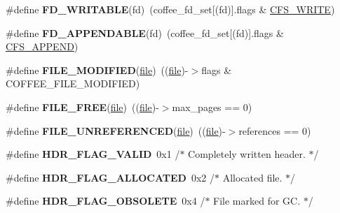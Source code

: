 \begin{DoxyCompactItemize}
\item 
\hypertarget{cfs-coffee_8c_a79709d15b94b762a4b9ea6f5717be08f}{}\#define {\bfseries F\+D\+\_\+\+W\+R\+I\+T\+A\+B\+L\+E}(fd)~(coffee\+\_\+fd\+\_\+set\mbox{[}(fd)\mbox{]}.flags \& \hyperlink{group__cfs_ga798793edf50f38e3e41364f0f6f71201}{C\+F\+S\+\_\+\+W\+R\+I\+T\+E})\label{cfs-coffee_8c_a79709d15b94b762a4b9ea6f5717be08f}

\item 
\hypertarget{cfs-coffee_8c_a70b88c0c34f68524d35d16656a4cf39a}{}\#define {\bfseries F\+D\+\_\+\+A\+P\+P\+E\+N\+D\+A\+B\+L\+E}(fd)~(coffee\+\_\+fd\+\_\+set\mbox{[}(fd)\mbox{]}.flags \& \hyperlink{group__cfs_ga2b402228c26a3590f1d4bf44df0b2b82}{C\+F\+S\+\_\+\+A\+P\+P\+E\+N\+D})\label{cfs-coffee_8c_a70b88c0c34f68524d35d16656a4cf39a}

\item 
\hypertarget{cfs-coffee_8c_aa66cf9bb1e6c681411cde5e1268ae034}{}\#define {\bfseries F\+I\+L\+E\+\_\+\+M\+O\+D\+I\+F\+I\+E\+D}(\hyperlink{structfile}{file})~((\hyperlink{structfile}{file})-\/$>$flags \& C\+O\+F\+F\+E\+E\+\_\+\+F\+I\+L\+E\+\_\+\+M\+O\+D\+I\+F\+I\+E\+D)\label{cfs-coffee_8c_aa66cf9bb1e6c681411cde5e1268ae034}

\item 
\hypertarget{cfs-coffee_8c_adab7cb75804aa1920de6cebc85ecf422}{}\#define {\bfseries F\+I\+L\+E\+\_\+\+F\+R\+E\+E}(\hyperlink{structfile}{file})~((\hyperlink{structfile}{file})-\/$>$max\+\_\+pages == 0)\label{cfs-coffee_8c_adab7cb75804aa1920de6cebc85ecf422}

\item 
\hypertarget{cfs-coffee_8c_af357f256eac66cf6364c32ea9a4bfd51}{}\#define {\bfseries F\+I\+L\+E\+\_\+\+U\+N\+R\+E\+F\+E\+R\+E\+N\+C\+E\+D}(\hyperlink{structfile}{file})~((\hyperlink{structfile}{file})-\/$>$references == 0)\label{cfs-coffee_8c_af357f256eac66cf6364c32ea9a4bfd51}

\item 
\hypertarget{cfs-coffee_8c_a8352254ac7fbcdd273fcdcd7c2a16ead}{}\#define {\bfseries H\+D\+R\+\_\+\+F\+L\+A\+G\+\_\+\+V\+A\+L\+I\+D}~0x1	/$\ast$ Completely written header. $\ast$/\label{cfs-coffee_8c_a8352254ac7fbcdd273fcdcd7c2a16ead}

\item 
\hypertarget{cfs-coffee_8c_ab0cdbd1d4a6f82e48c5bd61caee11e6b}{}\#define {\bfseries H\+D\+R\+\_\+\+F\+L\+A\+G\+\_\+\+A\+L\+L\+O\+C\+A\+T\+E\+D}~0x2	/$\ast$ Allocated file. $\ast$/\label{cfs-coffee_8c_ab0cdbd1d4a6f82e48c5bd61caee11e6b}

\item 
\hypertarget{cfs-coffee_8c_a65ff9b7bf6557e2e731b293087d185a4}{}\#define {\bfseries H\+D\+R\+\_\+\+F\+L\+A\+G\+\_\+\+O\+B\+S\+O\+L\+E\+T\+E}~0x4	/$\ast$ File marked for G\+C. $\ast$/\label{cfs-coffee_8c_a65ff9b7bf6557e2e731b293087d185a4}


\end{DoxyCompactItemize}
